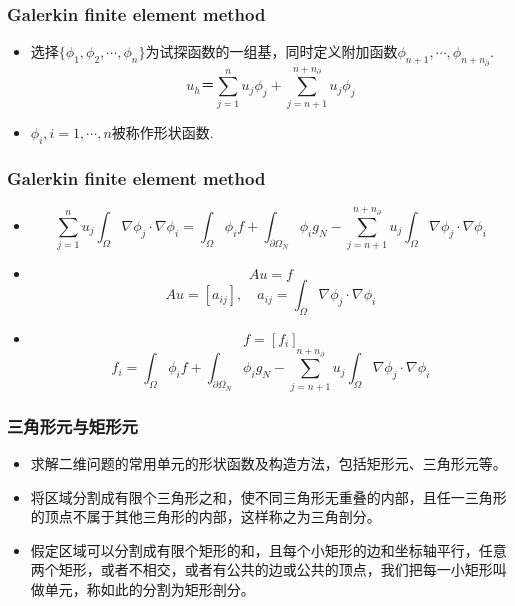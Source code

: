 \documentclass[notheorems,mathserif,table,compress]{beamer}  %
\begin{document}
%
\begin{frame}
\frametitle{Galerkin finite element method}
\begin{itemize}
\item 选择$\{\phi_1,\phi_2,\cdots,\phi_n\}$为试探函数的一组基，同时定义附加函数$\phi_{n+1},\cdots,\phi_{n+n_{\partial}}$.
\begin{displaymath}
u_h＝\sum_{j=1}^n u_j\phi_j+\sum_{j=n+1}^{n+n_{\partial}}u_j\phi_j
\end{displaymath}

\item $\phi_i,i=1,\cdots,n$被称作形状函数.
\end{itemize}
\end{frame}

\begin{frame}
\frametitle{Galerkin finite element method}
\begin{itemize}
\item 
\begin{displaymath}
\sum_{j=1}^n u_j\int_{\Omega}\nabla\phi_j\cdot\nabla\phi_i=\int_{\Omega}\phi_i f+\int_{\partial\Omega_N}\phi_ig_N-\sum_{j=n+1}^{n+n_\partial}u_j\int_{\Omega}\nabla\phi_j\cdot\nabla\phi_i
\end{displaymath}
\item
\begin{displaymath}
Au=f
\end{displaymath}
\begin{displaymath}
Au=[a_{ij}],\quad a_{ij}=\int_{\Omega}\nabla\phi_j\cdot\nabla\phi_i\end{displaymath}
\item
\begin{displaymath}
f=[f_i]
\end{displaymath}
\begin{displaymath}
f_i=\int_{\Omega}\phi_i f+\int_{\partial\Omega_N}\phi_ig_N-\sum_{j=n+1}^{n+n_\partial}u_j\int_{\Omega}\nabla\phi_j\cdot\nabla\phi_i
\end{displaymath}
\end{itemize}
\end{frame}

%
\begin{frame}
\frametitle{三角形元与矩形元}
\begin{itemize}
\item 求解二维问题的常用单元的形状函数及构造方法，包括矩形元、三角形元等。
\item 将区域分割成有限个三角形之和，使不同三角形无重叠的内部，且任一三角形的顶点不属于其他三角形的内部，这样称之为三角剖分。
\item 假定区域可以分割成有限个矩形的和，且每个小矩形的边和坐标轴平行，任意两个矩形，或者不相交，或者有公共的边或公共的顶点，我们把每一小矩形叫做单元，称如此的分割为矩形剖分。
\end{itemize}
\end{frame}
\end{document}
